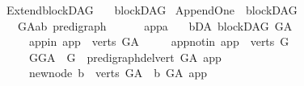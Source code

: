 %
\begin{isabellebody}%
%
%
\isadelimtheory
%
\endisadelimtheory
%
\isatagtheory
{}\isamarkupfalse%
\ Extend{\isacharunderscore}{\kern0pt}blockDAG\isanewline
\ \ \ blockDAG\isanewline
{}%
\endisatagtheory
{\isafoldtheory}%
%
\isadelimtheory
%
\endisadelimtheory
%
\isadelimdocument
%
\endisadelimdocument
%
\isatagdocument
%
\isamarkuptrue%
%
\isamarkuptrue%
%
\endisatagdocument
{\isafolddocument}%
%
\isadelimdocument
%
\endisadelimdocument
{}\isamarkupfalse%
\ Append{\isacharunderscore}{\kern0pt}One\ {\isacharequal}{\kern0pt}\ blockDAG\ {\isacharplus}{\kern0pt}\isanewline
\ \ \ G{\isacharunderscore}{\kern0pt}A{\isacharcolon}{\kern0pt}{\isacharcolon}{\kern0pt}{\isachardoublequoteopen}{\isacharparenleft}{\kern0pt}{\isacharprime}{\kern0pt}a{\isacharcomma}{\kern0pt}{\isacharprime}{\kern0pt}b{\isacharparenright}{\kern0pt}\ pre{\isacharunderscore}{\kern0pt}digraph{\isachardoublequoteclose}\ {\isacharparenleft}{\kern0pt}\isanewline
\ \ \ \ \ app{\isacharcolon}{\kern0pt}{\isacharcolon}{\kern0pt}{\isacharprime}{\kern0pt}a\isanewline
\ \ \ bD{\isacharunderscore}{\kern0pt}A{\isacharcolon}{\kern0pt}\ {\isachardoublequoteopen}blockDAG\ G{\isacharunderscore}{\kern0pt}A{\isachardoublequoteclose}\isanewline
\ \ \ \ \ app{\isacharunderscore}{\kern0pt}in{\isacharcolon}{\kern0pt}\ {\isachardoublequoteopen}app\ {\isasymin}\ verts\ G{\isacharunderscore}{\kern0pt}A{\isachardoublequoteclose}\isanewline
\ \ \ \ \ app{\isacharunderscore}{\kern0pt}notin{\isacharcolon}{\kern0pt}\ {\isachardoublequoteopen}app\ {\isasymnotin}\ verts\ G{\isachardoublequoteclose}\isanewline
\ \ \ \ \ GG{\isacharunderscore}{\kern0pt}A\ {\isacharcolon}{\kern0pt}\ {\isachardoublequoteopen}G\ {\isacharequal}{\kern0pt}\ pre{\isacharunderscore}{\kern0pt}digraph{\isachardot}{\kern0pt}del{\isacharunderscore}{\kern0pt}vert\ G{\isacharunderscore}{\kern0pt}A\ app{\isachardoublequoteclose}\isanewline
\ \ \ \ \ new{\isacharunderscore}{\kern0pt}node{\isacharcolon}{\kern0pt}\ {\isachardoublequoteopen}{\isasymforall}b\ {\isasymin}\ verts\ G{\isacharunderscore}{\kern0pt}A{\isachardot}{\kern0pt}\ {\isasymnot}\ b\ {\isasymrightarrow}\isactrlbsub G{\isacharunderscore}{\kern0pt}A\isactrlesub \ app{\isachardoublequoteclose}\isanewline

\end{isabellebody}
